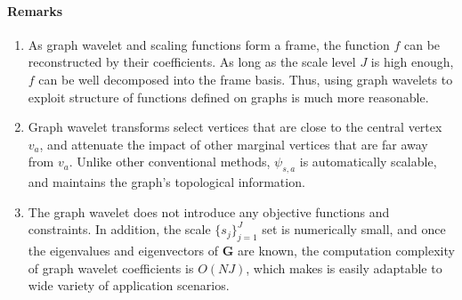 \paragraph{\textbf{Remarks}}
\begin{enumerate}
\item As graph wavelet and scaling functions form a frame, the function $f$ can be reconstructed by their coefficients.
As long as the scale level $J$ is high enough, $f$ can be well decomposed into the frame basis. Thus, using graph wavelets to exploit structure of functions defined on graphs is much more reasonable.

\item Graph wavelet transforms select vertices that are close to the central vertex $v_a$, and attenuate the impact of other marginal vertices that are far away from $v_a$.
Unlike other conventional methods,  $\psi_{s,a}$ is automatically scalable, and maintains the graph's topological information.

\item The graph wavelet does not introduce any objective functions and constraints. In addition, the scale $\{s_j\}_{j=1}^J$ set is numerically small, and once the eigenvalues and eigenvectors of $\mathbf{G}$ are known, the computation complexity of graph wavelet coefficients is $O(NJ)$, which makes is easily adaptable to wide variety of application scenarios.
\end{enumerate}

